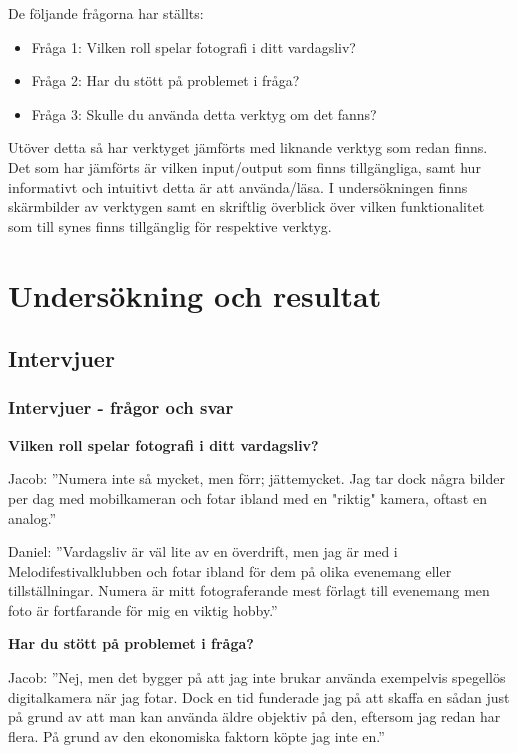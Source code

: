 \documentclass[11pt]{article}
\begin{document}
De följande frågorna har ställts: 
\fussy

\begin{itemize}
    \item Fråga 1: Vilken roll spelar fotografi i ditt vardagsliv?
    \item Fråga 2: Har du stött på problemet i fråga?
    \item Fråga 3: Skulle du använda detta verktyg om det fanns?
\end{itemize}

\bigskip

Utöver detta så har verktyget jämförts med liknande verktyg som redan finns. Det
som har jämförts är vilken input/output som finns tillgängliga, samt hur
informativt och intuitivt detta är att använda/läsa. I undersökningen finns
skärmbilder av verktygen samt en skriftlig överblick över vilken funktionalitet
som till synes finns tillgänglig för respektive verktyg.

\clearpage

\section{Undersökning och resultat}
\subsection{Intervjuer}
\subsubsection{Intervjuer - frågor och svar}
\textbf{Vilken roll spelar fotografi i ditt vardagsliv?}\par

Jacob: ”Numera inte så mycket, men förr; jättemycket. Jag tar dock några bilder
per dag med mobilkameran och fotar ibland med en "riktig" kamera, oftast en
analog.”\par

Daniel: ”Vardagsliv är väl lite av en överdrift, men jag är med i
Melodifestivalklubben och fotar ibland för dem på olika evenemang eller
tillställningar. Numera är mitt fotograferande mest förlagt till evenemang men
foto är fortfarande för mig en viktig hobby.”\par

\textbf{Har du stött på problemet i fråga?}\par

Jacob: ”Nej, men det bygger på att jag inte brukar använda exempelvis spegellös
digitalkamera när jag fotar. Dock en tid funderade jag på att skaffa en sådan
just på grund av att man kan använda äldre objektiv på den, eftersom jag redan
har flera. På grund av den ekonomiska faktorn köpte jag inte en.”\par
\end{document}
